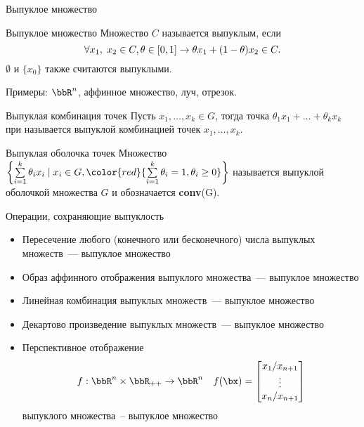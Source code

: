 \documentclass[12pt,russian]{beamer}
\begin{document}
\begin{frame}{Выпуклое множество}
\small
\begin{block}{Выпуклое множество}
Множество $C$ называется выпуклым, если 
\vspace{-4mm}
\[
\forall x_1, \; x_2 \in C, \theta \in [0, 1] \rightarrow \theta x_1 + (1 - \theta)x_2 \in C.
\vspace{-4mm}
\]
$\emptyset$ и $\{ x_0 \}$ также считаются выпуклыми.
\end{block}
Примеры: $\bbR^n$, аффинное множество, луч, отрезок.
\begin{block}{Выпуклая комбинация точек}
Пусть $x_1, \ldots, x_k \in G$, тогда точка $\theta_1 x_1 + \ldots + \theta_k x_k$ при {} называется выпуклой комбинацией точек $x_1,\ldots,x_k$.
\end{block}

\begin{block}{Выпуклая оболочка точек}
Множество $\left\{ \sum\limits_{i=1}^k \theta_i x_i \; | \; x_i \in G, {\color{red}{\sum\limits_{i=1}^k \theta_i = 1, \theta_i \geq 0}} \right\}$ называется выпуклой оболочкой множества $G$ и обозначается \textbf{conv}(G).
\end{block}

\end{frame}

\begin{frame}{Операции, сохраняющие выпуклость}
\begin{itemize}
\item Пересечение любого (конечного или бесконечного) числа выпуклых множеств~--- выпуклое множество
\item Образ аффинного отображения выпуклого множества~--- выпуклое множество
\item Линейная комбинация выпуклых множеств~--- выпуклое множество
\item Декартово произведение выпуклых множеств~--- выпуклое множество
\item Перспективное отображение
\[
f: \bbR^{n} \times \bbR_{++} \to \bbR^n \quad f(\bx) = \begin{bmatrix}
x_1 / x_{n+1}\\
\vdots \\
x_n / x_{n+1} 
\end{bmatrix}
\] 
выпуклого множества~-- выпуклое множество
\end{itemize}
\end{frame}
\end{document}
